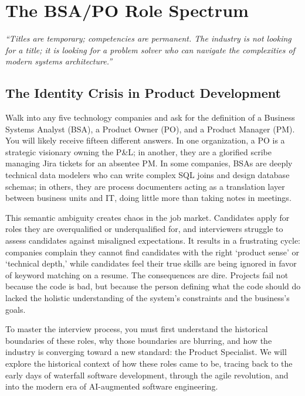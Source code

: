 \documentclass[
  11pt,
  openany,
  oneside]{book}
\renewenvironment{quote}{\begin{customquote}}{\end{customquote}}
\begin{document}
\chapter{The BSA/PO Role Spectrum}\label{the-bsapo-role-spectrum}

\begin{quote}
\emph{``Titles are temporary; competencies are permanent. The industry
is not looking for a title; it is looking for a problem solver who can
navigate the complexities of modern systems architecture.''}
\end{quote}

\section{The Identity Crisis in Product
Development}\label{the-identity-crisis-in-product-development}

Walk into any five technology companies and ask for the definition of a
Business Systems Analyst (BSA), a Product Owner (PO), and a Product
Manager (PM). You will likely receive fifteen different answers. In one
organization, a PO is a strategic visionary owning the P\&L; in another,
they are a glorified scribe managing Jira tickets for an absentee PM. In
some companies, BSAs are deeply technical data modelers who can write
complex SQL joins and design database schemas; in others, they are
process documenters acting as a translation layer between business units
and IT, doing little more than taking notes in meetings.

This semantic ambiguity creates chaos in the job market. Candidates
apply for roles they are overqualified or underqualified for, and
interviewers struggle to assess candidates against misaligned
expectations. It results in a frustrating cycle: companies complain they
cannot find candidates with the right `product sense' or `technical
depth,' while candidates feel their true skills are being ignored in
favor of keyword matching on a resume. The consequences are dire.
Projects fail not because the code is bad, but because the person
defining what the code should do lacked the holistic understanding of
the system's constraints and the business's goals.

To master the interview process, you must first understand the
historical boundaries of these roles, why those boundaries are blurring,
and how the industry is converging toward a new standard: the Product
Specialist. We will explore the historical context of how these roles
came to be, tracing back to the early days of waterfall software
development, through the agile revolution, and into the modern era of
AI-augmented software engineering.
\end{document}
